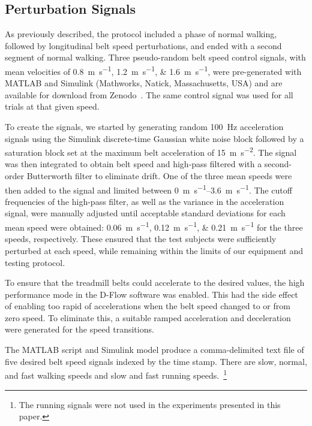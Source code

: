 \documentclass[fleqn,12pt]{wlpeerj}
\begin{document}
\subsection*{Perturbation Signals}
%
As previously described, the protocol included a phase of normal walking,
followed by longitudinal belt speed perturbations, and ended with a second
segment of normal walking. Three pseudo-random belt speed control signals, with
mean velocities of \SIlist{0.8;1.2;1.6}{\meter\per\second}, were pre-generated
with MATLAB and Simulink (Mathworks, Natick, Massachusetts, USA) and are
available for download from Zenodo~\citep{Hnat2015}. The same control signal
was used for all trials at that given speed.

To create the signals, we started by generating random 100~\si{\hertz}
acceleration signals using the Simulink discrete-time Gaussian white noise
block followed by a saturation block set at the maximum belt acceleration of
15~\si{\meter\per\second\squared}. The signal was then integrated to obtain
belt speed and high-pass filtered with a second-order Butterworth filter to
eliminate drift. One of the three mean speeds were then added to the signal and
limited between \SIrange{0}{3.6}{\meter\per\second}. The cutoff frequencies of
the high-pass filter, as well as the variance in the acceleration signal, were
manually adjusted until acceptable standard deviations for each mean speed were
obtained: \SIlist{0.06;0.12;0.21}{\meter\per\second} for the three speeds,
respectively. These ensured that the test subjects were sufficiently perturbed
at each speed, while remaining within the limits of our equipment and testing
protocol.

To ensure that the treadmill belts could accelerate to the desired values, the
high performance mode in the D-Flow software was enabled. This had the side
effect of enabling too rapid of accelerations when the belt speed changed to or
from zero speed. To eliminate this, a suitable ramped acceleration and
deceleration were generated for the speed transitions.

The MATLAB script and Simulink model produce a comma-delimited text file of
five desired belt speed signals indexed by the time stamp. There are slow, normal,
and fast walking speeds and slow and fast running speeds.~\footnote{The running
signals were not used in the experiments presented in this paper.}
\end{document}
